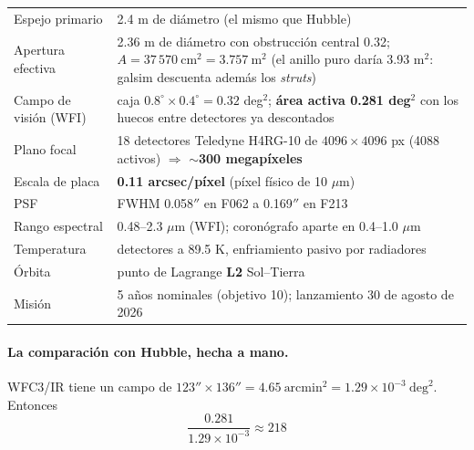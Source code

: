 \documentclass[11pt,a4paper]{article}
\begin{document}
\begin{center}
\begin{tabularx}{\linewidth}{lX}
\toprule
Espejo primario & 2.4 m de diámetro (el mismo que Hubble) \\
Apertura efectiva & 2.36 m de diámetro con obstrucción central 0.32; $A = 37\,570\ \text{cm}^2 =
   3.757\ \text{m}^2$ (el anillo puro daría 3.93 m$^2$: galsim descuenta además los \emph{struts}) \\
Campo de visión (WFI) & caja $0.8^\circ \times 0.4^\circ = 0.32$ deg$^2$; \textbf{área activa
   0.281 deg$^2$} con los huecos entre detectores ya descontados \\
Plano focal & 18 detectores Teledyne H4RG-10 de $4096\times4096$ px (4088 activos)
   $\Rightarrow$ $\sim$\textbf{300 megapíxeles} \\
Escala de placa & \textbf{0.11 arcsec/píxel} (píxel físico de 10 $\mu$m) \\
PSF & FWHM 0.058$''$ en F062 a 0.169$''$ en F213 \\
Rango espectral & 0.48--2.3 $\mu$m (WFI); coronógrafo aparte en 0.4--1.0 $\mu$m \\
Temperatura & detectores a 89.5 K, enfriamiento pasivo por radiadores \\
Órbita & punto de Lagrange \textbf{L2} Sol--Tierra \\
Misión & 5 años nominales (objetivo 10); lanzamiento 30 de agosto de 2026 \\
\bottomrule
\end{tabularx}
\end{center}

\paragraph{La comparación con Hubble, hecha a mano.} WFC3/IR tiene un campo de
$123''\times136'' = 4.65\ \text{arcmin}^2 = 1.29\times10^{-3}\ \text{deg}^2$. Entonces
\begin{equation}
\frac{0.281}{1.29\times10^{-3}} \approx 218
\end{equation}
\end{document}
